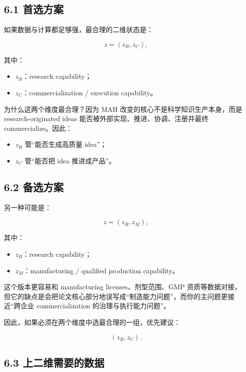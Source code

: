 \documentclass[12pt,fontset=none]{ctexart}
\begin{document}
\subsection{6.1 首选方案}

如果数据与计算都足够强，最合理的二维状态是：

\[
z=(z_R,z_C),
\]

其中：

\begin{itemize}[leftmargin=2em]
    \item \(z_R\)：research capability；
    \item \(z_C\)：commercialization / execution capability。
\end{itemize}

为什么这两个维度最合理？因为 MAH 改变的核心不是科学知识生产本身，而是 research-originated ideas 能否被外部实现、推进、协调、注册并最终 commercialize。因此：

\begin{itemize}[leftmargin=2em]
    \item \(z_R\) 管“能否生成高质量 idea”；
    \item \(z_C\) 管“能否把 idea 推进成产品”。
\end{itemize}

\subsection{6.2 备选方案}

另一种可能是：

\[
z=(z_R,z_M),
\]

其中：

\begin{itemize}[leftmargin=2em]
    \item \(z_R\)：research capability；
    \item \(z_M\)：manufacturing / qualified production capability。
\end{itemize}

这个版本更容易和 manufacturing licenses、剂型范围、GMP 资质等数据对接，
但它的缺点是会把论文核心部分地误写成“制造能力问题”，而你的主问题更接近“跨企业 commercialization 的治理与执行能力问题”。

因此，如果必须在两个维度中选最合理的一组，优先建议：

\[
(z_R,z_C).
\]

\subsection{6.3 上二维需要的数据}
\end{document}
